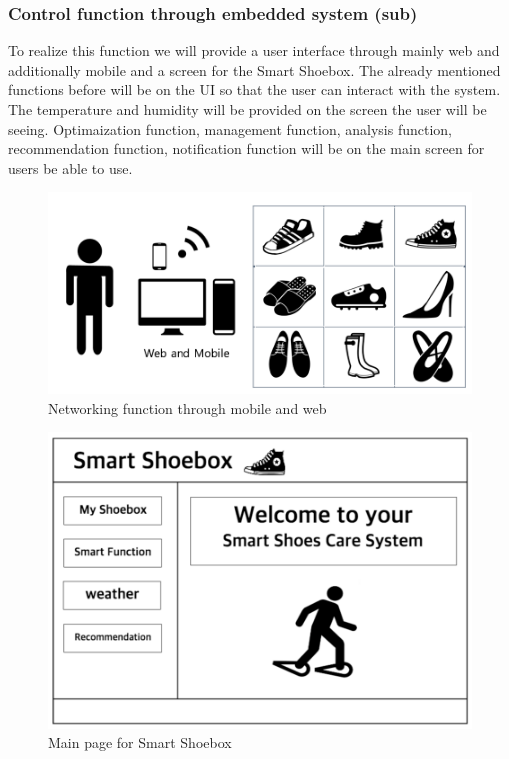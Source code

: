 \documentclass[conference]{IEEEtran}
\begin{document}
\subsubsection{Control function through embedded system (sub)}
To realize this function we will provide a user interface through mainly web and additionally mobile and a screen for the Smart Shoebox. The already mentioned functions before will be on the UI so that the user can interact with the system. The temperature and humidity will be provided on the screen the user will be seeing. Optimaization function, management function, analysis function, recommendation function, notification function will be on the main screen for users be able to use. 
\begin{figure}[htbp]
\begin{center}
    \includegraphics[scale=0.4]{UI3}
   \caption{Networking function through mobile and web}\label{fig:label}
\end{center}
\end{figure}
\begin{figure}[htbp]
\begin{center}
    \includegraphics[scale=0.4]{UI4}
   \caption{Main page for Smart Shoebox}\label{fig:label}
\end{center}
\end{figure}
\end{document}
